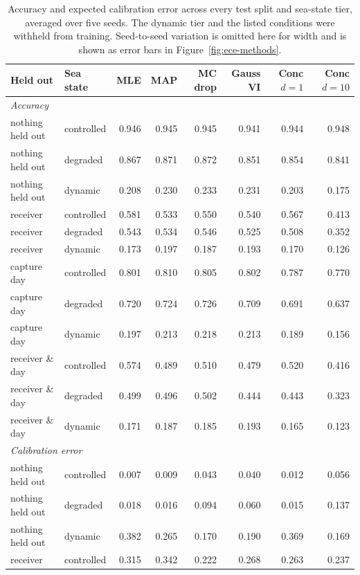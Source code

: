 \begin{table}[!htbp]
\centering
\caption{Accuracy and expected calibration error across every test split and sea-state tier, averaged over five seeds. The dynamic tier and the listed conditions were withheld from training. Seed-to-seed variation is omitted here for width and is shown as error bars in Figure~\ref{fig:ece-methods}.}
\label{tab:bayes-results}
\footnotesize
\begin{tabular}{llrrrrrr}
\toprule
Held out & Sea state & MLE & MAP & MC drop & Gauss VI & Conc $d{=}1$ & Conc $d{=}10$ \\
\midrule
\multicolumn{7}{l}{\emph{Accuracy}} \\
nothing held out & controlled & 0.946 & 0.945 & 0.945 & 0.941 & 0.944 & 0.948 \\
nothing held out & degraded & 0.867 & 0.871 & 0.872 & 0.851 & 0.854 & 0.841 \\
nothing held out & dynamic & 0.208 & 0.230 & 0.233 & 0.231 & 0.203 & 0.175 \\
receiver & controlled & 0.581 & 0.533 & 0.550 & 0.540 & 0.567 & 0.413 \\
receiver & degraded & 0.543 & 0.534 & 0.546 & 0.525 & 0.508 & 0.352 \\
receiver & dynamic & 0.173 & 0.197 & 0.187 & 0.193 & 0.170 & 0.126 \\
capture day & controlled & 0.801 & 0.810 & 0.805 & 0.802 & 0.787 & 0.770 \\
capture day & degraded & 0.720 & 0.724 & 0.726 & 0.709 & 0.691 & 0.637 \\
capture day & dynamic & 0.197 & 0.213 & 0.218 & 0.213 & 0.189 & 0.156 \\
receiver \& day & controlled & 0.574 & 0.489 & 0.510 & 0.479 & 0.520 & 0.416 \\
receiver \& day & degraded & 0.499 & 0.496 & 0.502 & 0.444 & 0.443 & 0.323 \\
receiver \& day & dynamic & 0.171 & 0.187 & 0.185 & 0.193 & 0.165 & 0.123 \\
\midrule
\multicolumn{7}{l}{\emph{Calibration error}} \\
nothing held out & controlled & 0.007 & 0.009 & 0.043 & 0.040 & 0.012 & 0.056 \\
nothing held out & degraded & 0.018 & 0.016 & 0.094 & 0.060 & 0.015 & 0.137 \\
nothing held out & dynamic & 0.382 & 0.265 & 0.170 & 0.190 & 0.369 & 0.169 \\
receiver & controlled & 0.315 & 0.342 & 0.222 & 0.268 & 0.263 & 0.237 \\

\end{tabular}
\end{table}
